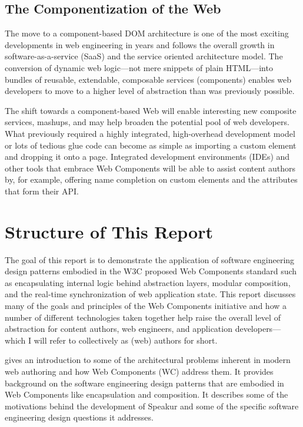 \subsection{The Componentization of the Web}
The move to a component-based DOM architecture is one of the most exciting developments in web engineering in years and follows the overall growth in software-as-a-service (SaaS) 
and the service oriented architecture
model. 
The conversion of dynamic web logic---not mere snippets of plain HTML---into bundles of reusable, extendable, composable services (components) enables web developers to move to a higher level of abstraction than was previously possible.

The shift towards a component-based Web will enable interesting new composite services, mashups, and may help broaden the potential pool of web developers. 
What previously required a highly integrated, high-overhead development model or lots of tedious glue code can become as simple as importing a custom element and dropping it onto a page.
Integrated development environments (IDEs) and other tools that embrace Web Components will be able to assist content authors by, for example, offering name completion on custom elements and the attributes that form their API.

\section{Structure of This Report}
%

The goal of this report is to demonstrate the application of 
software engineering 
design patterns embodied in the W3C proposed Web Components standard such as 
encapsulating internal logic 
behind abstraction layers, 
modular composition, 
and the real-time synchronization of web application state. 
This report discusses many of the goals and principles of the Web Components initiative and how a number of different technologies taken together help raise the overall level of 
abstraction for content authors, web engineers, and application developers---which I will refer to collectively as (web) authors for short.

 gives an introduction to some of the architectural problems inherent in modern web authoring and how Web Components (WC) address them. 
It provides background on the software engineering design patterns that are embodied in Web Components like encapsulation and composition.
It describes some of the motivations behind the development of Speakur and some of the specific software engineering design questions it addresses.

